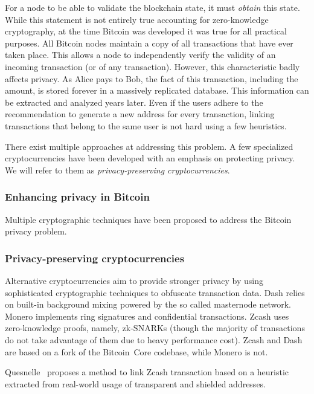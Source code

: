 For a node to be able to validate the blockchain state, it must \textit{obtain} this state.
While this statement is not entirely true accounting for zero-knowledge cryptography, at the time Bitcoin was developed it was true for all practical purposes.
All Bitcoin nodes maintain a copy of all transactions that have ever taken place.
This allows a node to independently verify the validity of an incoming transaction (or of any transaction).
However, this characteristic badly affects privacy.
As Alice pays to Bob, the fact of this transaction, including the amount, is stored forever in a massively replicated database.
This information can be extracted and analyzed years later.
Even if the users adhere to the recommendation to generate a new address for every transaction, linking transactions that belong to the same user is not hard using a few heuristics.

There exist multiple approaches at addressing this problem.
A few specialized cryptocurrencies have been developed with an emphasis on protecting privacy.
We will refer to them as \textit{privacy-preserving cryptocurrencies}.

\subsubsection*{Enhancing privacy in Bitcoin}

Multiple cryptographic techniques have been proposed to address the Bitcoin privacy problem.


\subsubsection*{Privacy-preserving cryptocurrencies}

Alternative cryptocurrencies aim to provide stronger privacy by using sophisticated cryptographic techniques to obfuscate transaction data.
Dash relies on built-in background mixing powered by the so called masternode network.
Monero implements ring signatures and confidential transactions.
Zcash uses zero-knowledge proofs, namely, zk-SNARKs (though the majority of transactions do not take advantage of them due to heavy performance cost).
Zcash and Dash are based on a fork of the Bitcoin~Core codebase, while Monero is not.

Quesnelle~\cite{Quesnelle2017} proposes a method to link Zcash transaction based on a heuristic extracted from real-world usage of transparent and shielded addresses.

